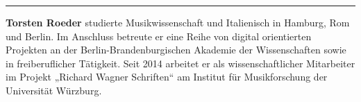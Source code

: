 \documentclass[a4paper,
fontsize=11pt,
oneside,
numbers=noperiodatend,
parskip=half-,
bibliography=totoc,
final
]{scrartcl}
\begin{document}
\begin{center}\rule{0.5\linewidth}{\linethickness}\end{center}

\textbf{Torsten Roeder} studierte Musikwissenschaft und Italienisch in
Hamburg, Rom und Berlin. Im Anschluss betreute er eine Reihe von digital
orientierten Projekten an der Berlin-Brandenburgischen Akademie der
Wissenschaften sowie in freiberuflicher Tätigkeit. Seit 2014 arbeitet er
als wissenschaftlicher Mitarbeiter im Projekt „Richard Wagner
Schriften`` am Institut für Musikforschung der Universität Würzburg.
\end{document}
